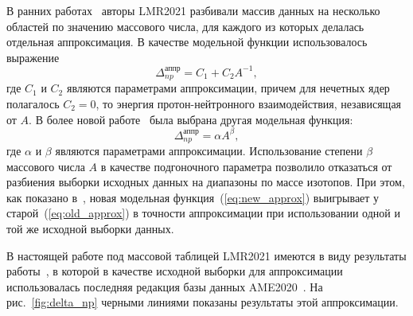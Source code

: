 В ранних работах~\cite{vladimirova2021-1,vladimirova2021-2} авторы LMR2021 разбивали массив данных на несколько областей по значению массового числа, для каждого из которых делалась отдельная аппроксимация. В качестве модельной функции использовалось выражение
\begin{equation}
\Delta^\text{аппр}_{np} = C_1 + C_2 A^{-1},
\label{eq:old_approx}
\end{equation}
где $C_1$ и $C_2$ являются параметрами аппроксимации, причем для нечетных ядер полагалось $C_2 = 0$, то энергия протон-нейтронного взаимодействия, независящая от $A$. В более новой работе~\cite{vladimirova2022} была выбрана другая модельная функция:
\begin{equation}
\Delta^\text{аппр}_{np} = \alpha A^{\beta},
\label{eq:new_approx}
\end{equation}
где $\alpha$ и $\beta$ являются параметрами аппроксимации. Использование степени $\beta$ массового числа $A$ в качестве подгоночного параметра позволило отказаться от разбиения выборки исходных данных на диапазоны по массе изотопов. При этом, как показано в~\cite{vladimirova2022}, новая модельная функция~(\ref{eq:new_approx}) выигрывает у старой~(\ref{eq:old_approx}) в точности аппроксимации при использовании одной и той же исходной выборки данных.

В настоящей работе под массовой таблицей LMR2021 имеются в виду результаты работы~\cite{vladimirova2022}, в которой в качестве исходной выборки для аппроксимации использовалась последняя редакция базы данных AME2020~\cite{huang2021}. На рис.~\ref{fig:delta_np} черными линиями показаны результаты этой аппроксимации.


